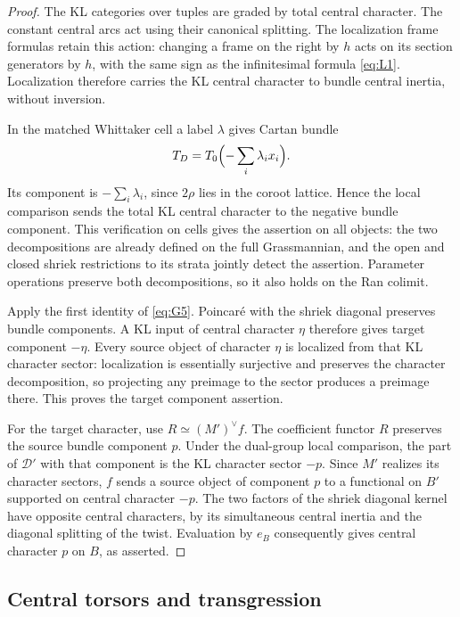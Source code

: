 \begin{proof}
The KL categories over tuples are graded by total central character.
The constant central arcs act using their canonical splitting.  The
localization frame formulas retain this action: changing a frame on
the right by \(h\) acts on its section generators by \(h\), with the
same sign as the infinitesimal formula \eqref{eq:L1}.  Localization
therefore carries the KL central character to bundle central inertia,
without inversion.

In the matched Whittaker cell a label \(\lambda\) gives Cartan bundle
\[
 T_D=T_0\Bigl(-\sum_i\lambda_i x_i\Bigr).
\]
Its component is \(-\sum_i\lambda_i\), since \(2\rho\) lies in the
coroot lattice.  Hence the local comparison sends the total KL central
character to the negative bundle component.  This verification on
cells gives the assertion on all objects: the two decompositions are
already defined on the full Grassmannian, and the open and closed
shriek restrictions to its strata jointly detect the assertion.
Parameter operations preserve both decompositions, so it also holds
on the Ran colimit.

Apply the first identity of \eqref{eq:G5}.  Poincar\'e with the shriek
diagonal preserves bundle components.  A KL input of central character
\(\eta\) therefore gives target component \(-\eta\).  Every source
object of character \(\eta\) is localized from that KL character
sector: localization is essentially surjective and preserves the
character decomposition, so projecting any preimage to the sector
produces a preimage there.  This proves the target component assertion.

For the target character, use \(R\simeq(M')^\vee f\).  The
coefficient functor \(R\) preserves the source bundle component
\(p\).  Under the dual-group local comparison, the part of
\(\mathcal D'\) with that component is the KL character sector
\(-p\).  Since \(M'\) realizes its character sectors, \(f\) sends
a source object of component \(p\) to a functional on \(B'\)
supported on central character \(-p\).  The two factors of the
shriek diagonal kernel have opposite central characters, by its
simultaneous central inertia and the diagonal splitting of the twist.
Evaluation by \(e_B\) consequently gives central character \(p\)
on \(B\), as asserted.
\end{proof}

\subsection{Central torsors and transgression}

